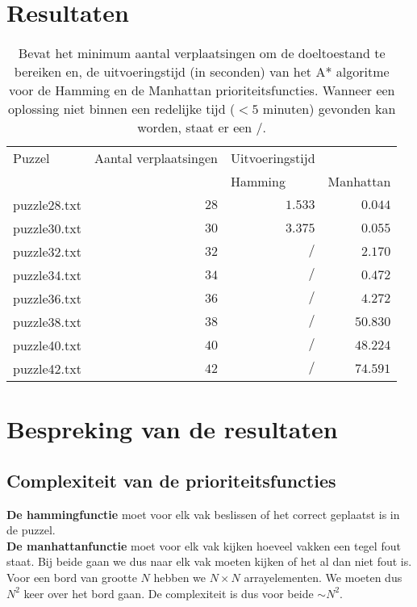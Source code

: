 \documentclass[a4paper]{article}
\numberwithin{equation}{section}
\begin{document}
    \pagebreak

    \section{Resultaten}
        \begin{table}[!ht]
            \centering
            \begin{tabular}{r r r r}
                \toprule
                \multicolumn{1}{l}{Puzzel} & \multicolumn{1}{l}{Aantal verplaatsingen} & \multicolumn{1}{l}{Uitvoeringstijd} &\\
                & &\multicolumn{1}{l}{Hamming}& \multicolumn{1}{l}{Manhattan} \\
                \midrule
                puzzle28.txt & $28$ & $1.533$ & $0.044$\\
                puzzle30.txt & $30$ & $3.375$ & $0.055$\\
                puzzle32.txt & $32$ & $/$ & $2.170$\\
                puzzle34.txt & $34$ & $/$ & $0.472$\\
                puzzle36.txt & $36$ & $/$ & $4.272$\\
                puzzle38.txt & $38$ & $/$ & $50.830$\\
                puzzle40.txt & $40$ & $/$ & $48.224$\\
                puzzle42.txt & $42$ & $/$ & $74.591$\\
                \bottomrule
            \end{tabular}
            \caption[Prestatie van het A* algoritme.]{Bevat het minimum aantal verplaatsingen om de doeltoestand te bereiken en,
               de uitvoeringstijd (in seconden) van het A* algoritme voor de Hamming en de Manhattan
                prioriteitsfuncties. Wanneer een oplossing niet binnen een redelijke
                tijd ($< 5$ minuten) gevonden kan worden, staat er een $/$.}
            \label{tab:Prestatie A*}
        \end{table}

    \pagebreak

    \section{Bespreking van de resultaten}
        \subsection{Complexiteit van de prioriteitsfuncties}
            \textbf{De hammingfunctie} moet voor elk vak beslissen of het correct geplaatst is in de puzzel.
            \\\textbf{De manhattanfunctie} moet voor elk vak kijken hoeveel vakken een tegel fout staat.
            Bij beide gaan we dus naar elk vak moeten kijken of het al dan niet fout is. 
            \\Voor een bord van grootte $N$ hebben we 
            $N \times N$ arrayelementen. We moeten dus $N^2$ keer over het bord gaan. De complexiteit is dus voor beide $\sim N^2$.
           
\end{document}
